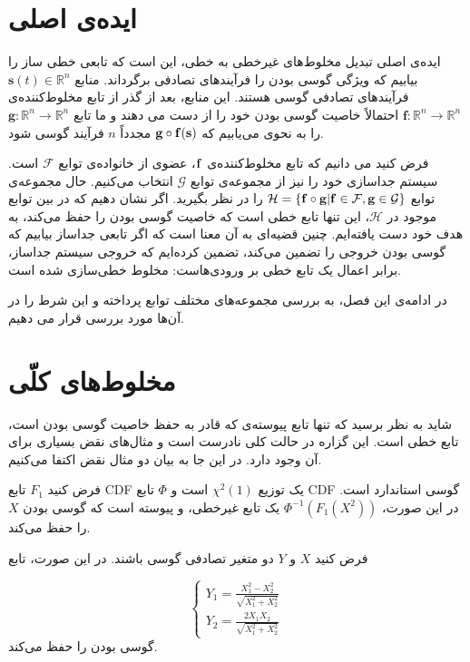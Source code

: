 \documentclass[oneside]{thesis}
\begin{document}
\section{ایده‌ی اصلی}
ایده‌ی اصلی تبدیل مخلوط‌های غیرخطی به خطی، این است که تابعی خطی ساز را بیابیم که ویژگی گوسی بودن را فرآیند‌های تصادفی برگرداند. منابع
$\mathbf{s}(t) \in \mathbb{R}^n$
 فرآیند‌های تصادفی گوسی هستند. این منابع، بعد از گذر از تابع مخلوط‌کننده‌ی 
 $\mathbf{f}: \mathbb{R}^n \to  \mathbb{R}^n$
 احتمالاً خاصیت گوسی بودن خود را از دست می دهند و ما تابع 
$\mathbf{g}: \mathbb{R}^n \to  \mathbb{R}^n$
را به نحوی می‌یابیم که
$\mathbf{g} \circ \mathbf{f} (\mathbf{s})$
مجدداً $n$ فرآیند گوسی شود.  
 
 
 فرض کنید می  دانیم که تابع مخلوط‌کننده‌ی 
 $\mathbf{f}$،
 عضوی از خانواده‌ی توابع 
 $\mathcal{F}$
 است. سیستم جداسازی خود را نیز از مجموعه‌ی توابع 
$\mathcal{G}$
  انتخاب می‌کنیم. حال مجموعه‌ی توابع
 $\mathcal{H} = \{\mathbf{f} \circ \mathbf{g} | \mathbf{f} \in \mathcal{F}, \mathbf{g} \in \mathcal{G}\}$
 را در نظر بگیرید. اگر نشان دهیم که در بین توابع موجود در 
 $\mathcal{H}$،
این  تنها تابع خطی است که خاصیت گوسی بودن را حفظ می‌کند، به هدف خود دست یافته‌ایم. چنین قضیه‌ای به آن معنا است که اگر تابعی جداساز بیابیم که گوسی بودن خروجی را تضمین می‌کند، تضمین‌ کرده‌ایم که خروجی سیستم جداساز، برابر اعمال یک تابع خطی بر ورودی‌هاست: مخلوط خطی‌سازی شده است. 

در ادامه‌ی این فصل، به بررسی مجموعه‌های مختلف توابع پرداخته و این شرط را در آن‌ها مورد بررسی قرار می دهیم.

\section{مخلوط‌های کلّی}
شاید به نظر برسید که تنها تابع پیوسته‌ی که قادر به حفظ خاصیت گوسی بودن است، تابع خطی است. این گزاره در حالت کلی نادرست است و مثال‌های نقض بسیاری برای آن وجود دارد. در این جا به بیان دو مثال نقض اکتفا می‌کنیم.
\begin{example}
فرض کنید 
$F_1$
تابع CDF یک توزیع
$\chi^2(1)$
است و 
$\Phi$
تابع 
CDF
گوسی استاندارد است. در این صورت،
$\Phi^{-1}(F_1(X^2))$
یک تابع غیرخطی، و پیوسته است که گوسی بودن $X$ را حفظ می‌کند.
\end{example}

\begin{example}
 فرض کنید $X$ و $Y$ دو متغیر تصادفی گوسی باشند. در این صورت، تابع 
 
 \begin{equation}
\begin{cases}
Y_1 = \frac{X_1^2 - X_2^2}{\sqrt{X_1^2 + X_2^2}}\\
Y_2 = \frac{2X_1X_2}{\sqrt{X_1^2 + X_2^2}}
\end{cases}
 \end{equation}
 گوسی بودن را حفظ می‌کند.
\end{example}
\end{document}

